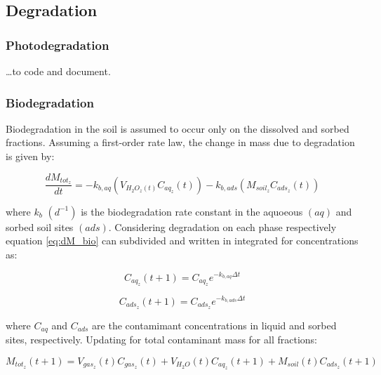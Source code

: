 \documentclass[]{article}
\begin{document}
\hypertarget{degradation}{%
\subsection{Degradation}\label{degradation}}

\hypertarget{photodegradation}{%
\subsubsection{Photodegradation}\label{photodegradation}}

\ldots{}to code and document.

\hypertarget{biodegradation}{%
\subsubsection{Biodegradation}\label{biodegradation}}

Biodegradation in the soil is assumed to occur only on the dissolved and
sorbed fractions. Assuming a first-order rate law, the change in mass
due to degradation is given by:

\begin{equation}
\frac{dM_{tot_z}}{dt} = -k_{b,aq}(V_{H_2O_z(t)}C_{aq_z}(t))-k_{b,ads}(M_{soil_z}C_{ads_z}(t))
\label{eq:dM_bio}
\end{equation}

where \(k_{b}\) \((d^{-1})\) is the biodegradation rate constant in the
aquoeous \((aq)\) and sorbed soil sites \((ads)\). Considering
degradation on each phase respectively equation \ref{eq:dM_bio} can
subdivided and written in integrated for concentrations as:

\begin{equation}
C_{aq_z}(t+1) = C_{aq_z}e^{-k_{b,aq} \Delta t} 
\label{eq:Maq_t1}
\end{equation}

\begin{equation}
C_{ads_z}(t+1) = C_{ads_z}e^{-k_{b,ads} \Delta t}
\label{eq:Mads_t1}
\end{equation}

where \(C_{aq}\) and \(C_{ads}\) are the contamimant concentrations in
liquid and sorbed sites, respectively. Updating for total contaminant
mass for all fractions:

\begin{equation}
M_{tot_z}(t+1) = V_{gas_z}(t)C_{gas_z}(t) + V_{H_2O}(t)C_{aq_z}(t+1) + M_{soil}(t)C_{ads_z}(t+1)
\label{eq:Mtot_t1}
\end{equation}
\end{document}
